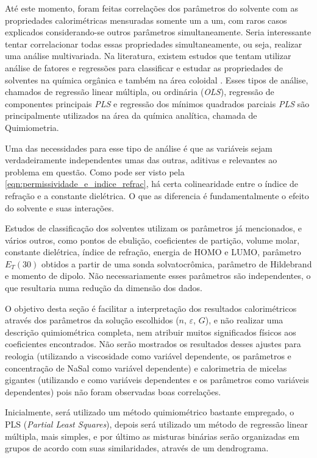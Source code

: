 		Até este momento, foram feitas correlações dos parâmetros do solvente com as propriedades calorimétricas mensuradas somente um a um, com raros casos explicados considerando-se outros parâmetros simultaneamente. Seria interessante tentar correlacionar todas essas propriedades simultaneamente, ou seja, realizar uma análise multivariada. Na literatura, existem estudos que tentam utilizar análise de fatores e regressões para classificar e estudar as propriedades de solventes na química orgânica\cite{Bohle1977,Chastrette1982, ReichardtSolvents} e também na área coloidal \cite{Moya2007a}. Esses tipos de análise, chamados de regressão linear múltipla, ou ordinária (\emph{OLS}), regressão de componentes principais \emph{PLS} e regressão dos mínimos quadrados parciais \emph{PLS} são principalmente utilizados na área da química analítica, chamada de Quimiometria.\cite{MarciaQuimiometria}
		
		Uma das necessidades para esse tipo de análise é que as variáveis sejam verdadeiramente independentes umas das outras, aditivas e relevantes ao problema em questão. Como pode ser visto pela \autoref{eqn:permissividade_e_indice_refrac}, há certa colinearidade entre o índice de refração e a constante dielétrica. O que as diferencia é fundamentalmente o efeito do solvente e suas interações.
		
		Estudos de classificação dos solventes utilizam os parâmetros já mencionados, e vários outros, como pontos de ebulição, coeficientes de partição, volume molar, constante dielétrica, índice de refração, energia de HOMO e LUMO, parâmetro \(E_T(30)\) obtidos a partir de uma sonda solvatocrômica, parâmetro de Hildebrand e momento de dipolo. Não necessariamente esses parâmetros são independentes, o que resultaria numa redução da dimensão dos dados.\cite{ReichardtSolvents}
		
		O objetivo desta seção é facilitar a interpretação dos resultados calorimétricos através dos parâmetros da solução escolhidos (\(n\), \(\varepsilon\), \(G\)), e não realizar uma descrição quimiométrica completa, nem atribuir muitos significados físicos aos coeficientes encontrados. Não serão mostrados os resultados desses ajustes para reologia (utilizando a viscosidade como variável dependente, os parâmetros e concentração de NaSal como variável dependente) e calorimetria de micelas gigantes (utilizando \cwlm{} e \DHwlm{} como variáveis dependentes e os parâmetros como variáveis dependentes) pois não foram observadas boas correlações.
		
		Inicialmente, será utilizado um método quimiométrico bastante empregado, o PLS (\emph{Partial Least Squares}), depois será utilizado um método de regressão linear múltipla, mais simples, e por último as misturas binárias serão organizadas em grupos de acordo com suas similaridades, através de um dendrograma.
		
